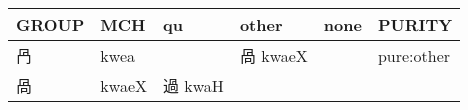 \documentclass[14pt,a4paper]{scrartcl}
\begin{document}
\begin{longtable}[c]{@{}llllll@{}}
\toprule
\begin{minipage}[b]{0.14\columnwidth}\raggedright\strut
GROUP
\strut\end{minipage} &
\begin{minipage}[b]{0.14\columnwidth}\raggedright\strut
MCH
\strut\end{minipage} &
\begin{minipage}[b]{0.14\columnwidth}\raggedright\strut
qu
\strut\end{minipage} &
\begin{minipage}[b]{0.14\columnwidth}\raggedright\strut
other
\strut\end{minipage} &
\begin{minipage}[b]{0.14\columnwidth}\raggedright\strut
none
\strut\end{minipage} &
\begin{minipage}[b]{0.14\columnwidth}\raggedright\strut
PURITY
\strut\end{minipage}\tabularnewline
\midrule
\endhead
\begin{minipage}[t]{0.14\columnwidth}\raggedright\strut
冎
\strut\end{minipage} &
\begin{minipage}[t]{0.14\columnwidth}\raggedright\strut
kwea
\strut\end{minipage} &
\begin{minipage}[t]{0.14\columnwidth}\raggedright\strut
\strut\end{minipage} &
\begin{minipage}[t]{0.14\columnwidth}\raggedright\strut
咼 kwaeX
\strut\end{minipage} &
\begin{minipage}[t]{0.14\columnwidth}\raggedright\strut
\strut\end{minipage} &
\begin{minipage}[t]{0.14\columnwidth}\raggedright\strut
pure:other
\strut\end{minipage}\tabularnewline
\begin{minipage}[t]{0.14\columnwidth}\raggedright\strut
咼
\strut\end{minipage} &
\begin{minipage}[t]{0.14\columnwidth}\raggedright\strut
kwaeX
\strut\end{minipage} &
\begin{minipage}[t]{0.14\columnwidth}\raggedright\strut
過 kwaH
\strut\end{minipage} &
\begin{minipage}[t]{0.14\columnwidth}\raggedright\strut

\end{minipage}
\end{longtable}
\end{document}

